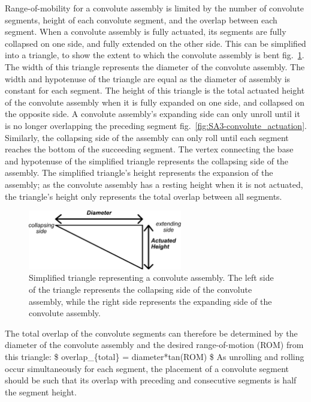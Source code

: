 \documentclass[defaultstyle,11pt]{comps}
\begin{document}
Range-of-mobility for a convolute assembly is limited by the number of convolute segments, height of each convolute segment, and the overlap between each segment.
When a convolute assembly is fully actuated, its segments are fully collapsed on one side, and fully extended on the other side.
This can be simplified into a triangle, to show the extent to which the convolute assembly is bent fig.~\ref{fig:SA3-convolute_tri}.
The width of this triangle represents the diameter of the convolute assembly.
The width and hypotenuse of the triangle are equal as the diameter of assembly is constant for each segment.
The height of this triangle is the total actuated height of the convolute assembly when it is fully expanded on one side, and collapsed on the opposite side.
A convolute assembly's expanding side can only unroll until it is no longer overlapping the preceding segment fig.~\ref{fig:SA3-convolute_actuation}.
Similarly, the collapsing side of the assembly can only roll until each segment reaches the bottom of the succeeding segment.
The vertex connecting the base and hypotenuse of the simplified triangle represents the collapsing side of the assembly.
The simplified triangle's height represents the expansion of the assembly; as the convolute assembly has a resting height when it is not actuated, the triangle's height only represents the total overlap between all segments.

\begin{figure}
\hypertarget{fig:SA3-convolute_tri}{%
\centering
\includegraphics[width=0.6\textwidth,height=\textheight]{../fig/SA3/Convolute_Triangle.png}
\caption{Simplified triangle representing a convolute assembly. The left side of the triangle represents the collapsing side of the convolute assembly, while the right side represents the expanding side of the convolute assembly.}\label{fig:SA3-convolute_tri}
}
\end{figure}

The total overlap of the convolute segments can therefore be determined by the diameter of the convolute assembly and the desired range-of-motion (ROM) from this triangle:
\$
overlap\_\{total\} = diameter*tan(ROM)
\$
As unrolling and rolling occur simultaneously for each segment, the placement of a convolute segment should be such that its overlap with preceding and consecutive segments is half the segment height.
\end{document}
